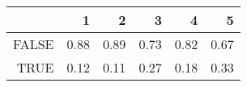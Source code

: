 \begin{table}[ht]
\centering
\begin{tabular}{rrrrrr}
  \hline
 & 1 & 2 & 3 & 4 & 5 \\ 
  \hline
FALSE & 0.88 & 0.89 & 0.73 & 0.82 & 0.67 \\ 
  TRUE & 0.12 & 0.11 & 0.27 & 0.18 & 0.33 \\ 
   \hline
\end{tabular}
\end{table}

